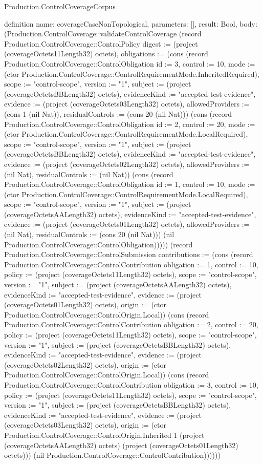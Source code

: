 \begin{lexlean}{Production.ControlCoverageCorpus}
\begin{semanticmodule}
definition{
  name: coverageCaseNonTopological,
  parameters: [],
  result: Bool,
  body: (Production.ControlCoverage::validateControlCoverage (record Production.ControlCoverage::ControlPolicy {digest := (project (coverageOctets11Length32) octets), obligations := (cons (record Production.ControlCoverage::ControlObligation {id := 3, control := 10, mode := (ctor Production.ControlCoverage::ControlRequirementMode.InheritedRequired), scope := "control-scope", version := "1", subject := (project (coverageOctetsBBLength32) octets), evidenceKind := "accepted-test-evidence", evidence := (project (coverageOctets03Length32) octets), allowedProviders := (cons 1 (nil Nat)), residualControls := (cons 20 (nil Nat))}) (cons (record Production.ControlCoverage::ControlObligation {id := 2, control := 20, mode := (ctor Production.ControlCoverage::ControlRequirementMode.LocalRequired), scope := "control-scope", version := "1", subject := (project (coverageOctetsBBLength32) octets), evidenceKind := "accepted-test-evidence", evidence := (project (coverageOctets02Length32) octets), allowedProviders := (nil Nat), residualControls := (nil Nat)}) (cons (record Production.ControlCoverage::ControlObligation {id := 1, control := 10, mode := (ctor Production.ControlCoverage::ControlRequirementMode.LocalRequired), scope := "control-scope", version := "1", subject := (project (coverageOctetsAALength32) octets), evidenceKind := "accepted-test-evidence", evidence := (project (coverageOctets01Length32) octets), allowedProviders := (nil Nat), residualControls := (cons 20 (nil Nat))}) (nil Production.ControlCoverage::ControlObligation))))}) (record Production.ControlCoverage::ControlSubmission {contributions := (cons (record Production.ControlCoverage::ControlContribution {obligation := 1, control := 10, policy := (project (coverageOctets11Length32) octets), scope := "control-scope", version := "1", subject := (project (coverageOctetsAALength32) octets), evidenceKind := "accepted-test-evidence", evidence := (project (coverageOctets01Length32) octets), origin := (ctor Production.ControlCoverage::ControlOrigin.Local)}) (cons (record Production.ControlCoverage::ControlContribution {obligation := 2, control := 20, policy := (project (coverageOctets11Length32) octets), scope := "control-scope", version := "1", subject := (project (coverageOctetsBBLength32) octets), evidenceKind := "accepted-test-evidence", evidence := (project (coverageOctets02Length32) octets), origin := (ctor Production.ControlCoverage::ControlOrigin.Local)}) (cons (record Production.ControlCoverage::ControlContribution {obligation := 3, control := 10, policy := (project (coverageOctets11Length32) octets), scope := "control-scope", version := "1", subject := (project (coverageOctetsBBLength32) octets), evidenceKind := "accepted-test-evidence", evidence := (project (coverageOctets03Length32) octets), origin := (ctor Production.ControlCoverage::ControlOrigin.Inherited 1 (project (coverageOctetsAALength32) octets) (project (coverageOctets01Length32) octets))}) (nil Production.ControlCoverage::ControlContribution))))}))
}


\end{semanticmodule}
\end{lexlean}
